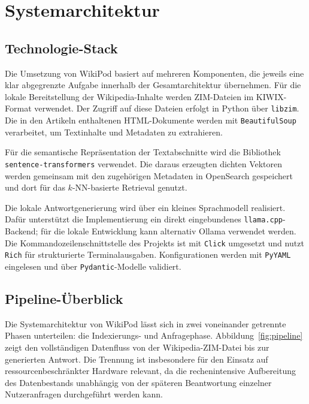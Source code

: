 \par\addvspace{1em}
\noindent\begin{minipage}[t]{\linewidth}
\vspace{0pt}
\chapter{Systemarchitektur}
\label{ch:architektur}

\section{Technologie-Stack}

Die Umsetzung von WikiPod basiert auf mehreren Komponenten, die jeweils eine klar
abgegrenzte Aufgabe innerhalb der Gesamtarchitektur übernehmen. Für die lokale
Bereitstellung der Wikipedia-Inhalte werden ZIM-Dateien im KIWIX-Format verwendet.
Der Zugriff auf diese Dateien erfolgt in Python über \texttt{libzim}. Die in den
Artikeln enthaltenen HTML-Dokumente werden mit \texttt{BeautifulSoup} verarbeitet,
um Textinhalte und Metadaten zu extrahieren.

Für die semantische Repräsentation der Textabschnitte wird die Bibliothek
\texttt{sentence-transformers} verwendet. Die daraus erzeugten dichten Vektoren
werden gemeinsam mit den zugehörigen Metadaten in OpenSearch gespeichert und
dort für das $k$-NN-basierte Retrieval genutzt.

Die lokale Antwortgenerierung wird über ein kleines Sprachmodell realisiert.
Dafür unterstützt die Implementierung ein direkt eingebundenes
\texttt{llama.cpp}-Backend; für die lokale Entwicklung kann alternativ Ollama
verwendet werden. Die Kommandozeilenschnittstelle des Projekts ist mit
\texttt{Click} umgesetzt und nutzt \texttt{Rich} für strukturierte
Terminalausgaben. Konfigurationen werden mit \texttt{PyYAML} eingelesen und über
\texttt{Pydantic}-Modelle validiert.

\end{minipage}\par\addvspace{1em}

\section{Pipeline-Überblick}

Die Systemarchitektur von WikiPod lässt sich in zwei voneinander getrennte
Phasen unterteilen: die Indexierungs- und Anfragephase.
Abbildung~\ref{fig:pipeline} zeigt den vollständigen Datenfluss von der
Wikipedia-ZIM-Datei bis zur generierten Antwort. Die Trennung ist insbesondere
für den Einsatz auf ressourcenbeschränkter Hardware relevant, da die
rechenintensive Aufbereitung des Datenbestands unabhängig von der späteren
Beantwortung einzelner Nutzeranfragen durchgeführt werden kann.

